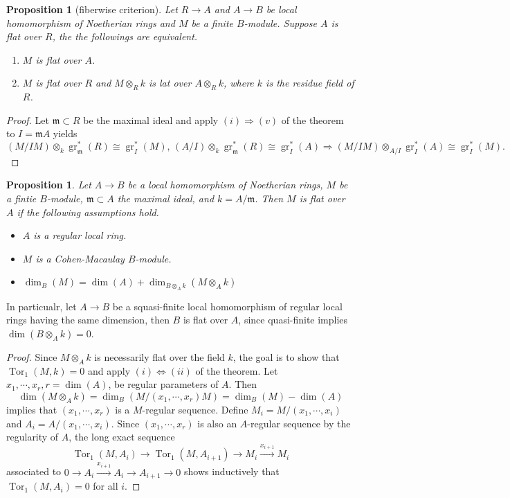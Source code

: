 \documentclass[leqno]{amsart}
\DeclareMathOperator{\gr}{gr}
\newcommand{\1}{\mathbf{1}}
\newcommand{\fm}{\mathfrak m}
\DeclareMathOperator{\Tor}{Tor}
\newtheorem{prop}[thm]{Proposition}
\theoremstyle{definition}
\theoremstyle{remark}
\begin{document}
\begin{prop}[fiberwise criterion]
	Let $R\to A$ and $A\to B$ be local homomorphism
	of Noetherian rings and $M$ be a finite $B$-module.
	Suppose $A$ is flat over  $R$,
	the the followings are equivalent.
	 \begin{enumerate}[label=(\alph*)]
		\item $M$ is flat over $A$.
		\item  $M$ is flat over  $R$
		and $M\otimes_Rk$ is  lat over $A\otimes_Rk$,
		where $k$ is the residue field of $R$.
	\end{enumerate}
\end{prop}
\begin{proof}
	Let $\fm\subset R$ be the maximal ideal 
	and apply $(i)\Longrightarrow(v)$ of
	the theorem to $I=\fm A$ yields
	\[
		(M/IM)\otimes_k\gr^*_\fm(R)\cong \gr^*_I(M),\,
		(A/I)\otimes_k\gr^*_\fm(R)\cong \gr^*_I(A)\Longrightarrow
		(M/IM)\otimes_{A/I}\gr^*_I(A)\cong \gr^*_I(M).
	\]
\end{proof}

\begin{prop}
	Let $A\to B$ be a local homomorphism of Noetherian rings,
	$M$ be a fintie $B$-module, 
	$\fm\subset A$ the maximal ideal, and $k=A/\fm$.
	Then $M$ is flat over  $A$ if the following assumptions hold.
	  \begin{itemize}
	 	\item $A$ is a regular local ring.
		\item $M$ is a Cohen-Macaulay $B$-module.
		\item  $\dim_B(M)=\dim(A)+\dim_{B\otimes_Ak}(M\otimes_Ak)$
	 \end{itemize}
\end{prop}
In particualr, let $A\to B$ be a squasi-finite 
local homomorphism of regular local rings having the same dimension,
then  $B$ is flat over  $A$,
since quasi-finite implies  $\dim(B\otimes_Ak)=0$.

\begin{proof}
	Since $M\otimes_Ak$ is necessarily
	flat over the field  $k$,
	the goal is to show that $\Tor_1(M,k)=0$
	and apply $(i)\Longleftrightarrow(ii)$
	of the theorem. 
	Let  $x_1,\cdots,x_r, r=\dim(A)$,
	be regular parameters of $A$.
	Then
	 \[
		 \dim(M\otimes_Ak)
		 =\dim_B(M/(x_1,\cdots,x_r)M)
		 =\dim_B(M)-\dim(A)
	\]
	implies that $(x_1,\cdots,x_r)$
	is a $M$-regular sequence.
	Define  
	$M_i=M/(x_1,\cdots,x_i)$ and 
	$A_i=A/(x_1,\cdots,x_i)$.
	Since $(x_1,\cdots,x_r)$
	is also an $A$-regular sequence
	by the regularity of $A$, 
	the long exact sequence
	\[
	\Tor_1(M,A_i)\to
	\Tor_1(M,A_{i+1})\to
	M_i\xrightarrow{x_{i+1}} M_i
	\]
	associated to 
	$0\to A_i\xrightarrow{x_{i+1}}
	A_i\to A_{i+1}\to 0$
	shows inductively that
	$\Tor_1(M,A_{i})=0$ for all $i$.
\end{proof}
\end{document}
